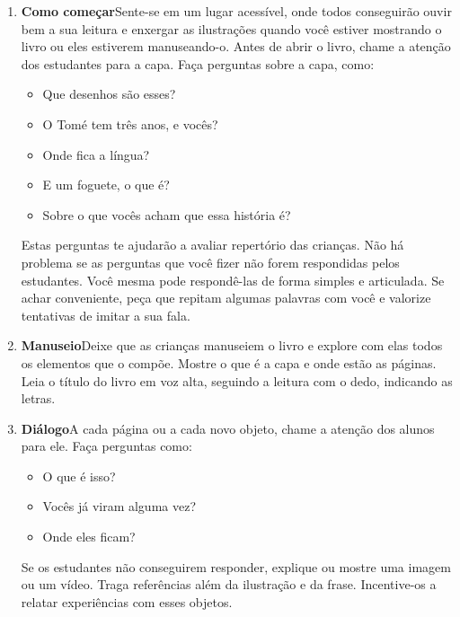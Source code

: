 \documentclass[11pt]{extarticle}
\begin{document}
\begin{enumerate}
\item \textbf{Como começar}\quad Sente-se em um lugar acessível, 
onde todos conseguirão ouvir bem a sua leitura e enxergar as ilustrações 
quando você estiver mostrando o livro ou eles estiverem manuseando-o. 
Antes de abrir o livro, chame a atenção dos estudantes para a capa. 
Faça perguntas sobre a capa, como: 

\begin{itemize}
\item Que desenhos são esses?
\item O Tomé tem três anos, e vocês?
\item Onde fica a língua?
\item E um foguete, o que é?
\item Sobre o que vocês acham que essa história é?
\end{itemize}

Estas perguntas te ajudarão a avaliar repertório das crianças. 
Não há problema se as perguntas que você fizer não forem respondidas pelos 
estudantes. Você mesma pode respondê-las de forma simples e articulada. Se achar 
conveniente, peça que repitam algumas palavras com você e valorize tentativas 
de imitar a sua fala. 
 
\item \textbf{Manuseio}\quad Deixe que as crianças manuseiem o livro 
e explore com elas todos os elementos que o compõe. Mostre o que é a 
capa e onde estão as páginas. Leia o título do livro em voz alta, seguindo 
a leitura com o dedo, indicando as letras. 

\item \textbf{Diálogo}\quad A cada página ou a cada novo objeto,
chame a atenção dos alunos para ele. Faça perguntas como:

\begin{itemize}
\item O que é isso?
\item Vocês já viram alguma vez? 
\item Onde eles ficam? 
\end{itemize}

Se os estudantes não conseguirem responder, explique ou mostre uma 
imagem ou um vídeo. Traga referências além da ilustração e da frase. 
Incentive-os a relatar experiências com esses objetos.




\end{enumerate}
\end{document}
